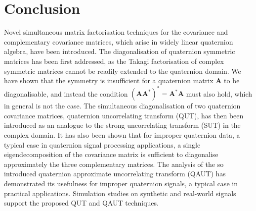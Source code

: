 \documentclass[review]{elsarticle}
\theoremstyle{plain}
\theoremstyle{remark}
\theoremstyle{plain}
\theoremstyle{definition}
\theoremstyle{prop}
\theoremstyle{definition}
\theoremstyle{plain}
\theoremstyle{plain}
\def \C {\mathbf{C}}
\def \v {\mathbf{v}}
\def \q {\mathbf{q}}
\def \Her {\mathsf{H}}
\def \Tr {\mathsf{T}}
\begin{document}
\section{Conclusion}\label{sect: conclusion}
Novel simultaneous matrix factorisation techniques for the covariance and complementary covariance matrices, which arise in widely linear quaternion algebra, have been introduced. The diagonalisation of quaternion symmetric matrices has been first addressed, as the Takagi factorisation of complex symmetric matrices cannot be readily extended to the quaternion domain. We have shown that the symmetry is insufficient for a quaternion matrix $\mathbf{A}$ to be diagonalisable, and instead the condition $(\mathbf{AA^*})^*=\mathbf{A}^*\mathbf{A}$ must also hold, which in general is not the case. The simultaneous diagonalisation of two quaternion covariance matrices, quaternion uncorrelating transform (QUT), has then been introduced as an analogue to the strong uncorrelating transform (SUT) in the complex domain. It has also been shown that for improper quaternion data, a typical case in quaternion signal processing applications, a single eigendecomposition of the covariance matrix is sufficient to diagonalise approximately the three complementary matrices. The analysis of the so introduced quaternion approximate uncorrelating transform (QAUT) has demonstrated its usefulness for improper quaternion signals, a typical case in practical applications. Simulation studies on synthetic and real-world signals support the proposed QUT and QAUT techniques.
\end{document}
